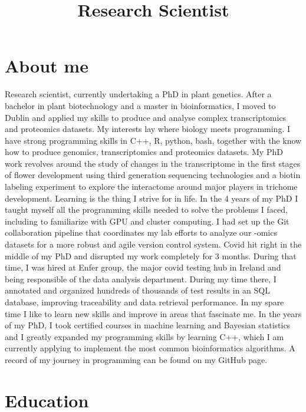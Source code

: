 \documentclass{moderncv}
\title{Research Scientist}
\begin{document}
\maketitle
\section{About me}
Research scientist, currently undertaking a PhD in plant genetics. After a
bachelor in plant biotechnology and a master in bioinformatics, I moved to
Dublin and applied my skills to produce and analyse complex transcriptomics
and proteomics datasets. My interests lay where biology meets programming. I
have strong programming skills in C++, R, python, bash, together with the know
how to produce genomics, transcriptomics and proteomics datasets. My PhD work
revolves around the study of changes in the transcriptome in the first stages
of flower development using third generation sequencing technologies and a
biotin labeling experiment to explore the interactome around major players in
trichome development. Learning is the thing I strive for in life. In the 4
years of my PhD I taught myself all the programming skills needed to solve the
problems I faced, including to familiarize with GPU and cluster computing. I
had set up the Git collaboration pipeline that coordinates my lab efforts to
analyze our -omics datasets for a more robust and agile version control
system. Covid hit right in the middle of my PhD and disrupted my work
completely for 3 months. During that time, I was hired at Enfer group, the
major covid testing hub in Ireland and being responsible of the data analysis
department. During my time there, I annotated and organized hundreds of
thousands of test results in an SQL database, improving traceability and data
retrieval performance. In my spare time I like to learn new skills and improve
in areas that fascinate me. In the years of my PhD, I took certified courses
in machine learning and Bayesian statistics and I greatly expanded my
programming skills by learning C++, which I am currently applying to implement
the most common bioinformatics algorithms. A record of my journey in
programming can be found on my GitHub page.
\section{Education}
\end{document}
